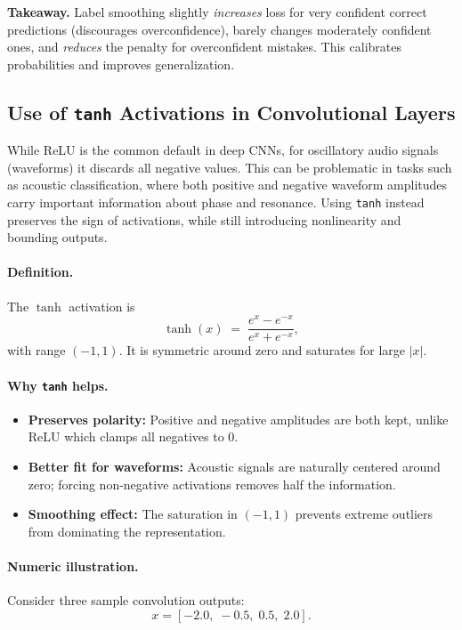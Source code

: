 \documentclass{article}
\begin{document}
\noindent\textbf{Takeaway.} Label smoothing slightly \emph{increases} loss for very confident correct predictions (discourages overconfidence), barely changes moderately confident ones, and \emph{reduces} the penalty for overconfident mistakes. This calibrates probabilities and improves generalization.

\FloatBarrier
\newpage

\subsection{Use of \texttt{tanh} Activations in Convolutional Layers}
While ReLU is the common default in deep CNNs, for oscillatory audio signals (waveforms) it discards all negative values. This can be problematic in tasks such as acoustic classification, where both positive and negative waveform amplitudes carry important information about phase and resonance. Using \texttt{tanh} instead preserves the sign of activations, while still introducing nonlinearity and bounding outputs.

\paragraph{Definition.}
The $\tanh$ activation is
\[
\tanh(x) \;=\; \frac{e^x - e^{-x}}{e^x + e^{-x}},
\]
with range $(-1,1)$. It is symmetric around zero and saturates for large $|x|$.

\paragraph{Why \texttt{tanh} helps.}
\begin{itemize}
  \item \textbf{Preserves polarity:} Positive and negative amplitudes are both kept, unlike ReLU which clamps all negatives to $0$.
  \item \textbf{Better fit for waveforms:} Acoustic signals are naturally centered around zero; forcing non-negative activations removes half the information.
  \item \textbf{Smoothing effect:} The saturation in $(-1,1)$ prevents extreme outliers from dominating the representation.
\end{itemize}

\paragraph{Numeric illustration.}
Consider three sample convolution outputs:
\[
x = [-2.0,\;-0.5,\;0.5,\;2.0].
\]
\end{document}
